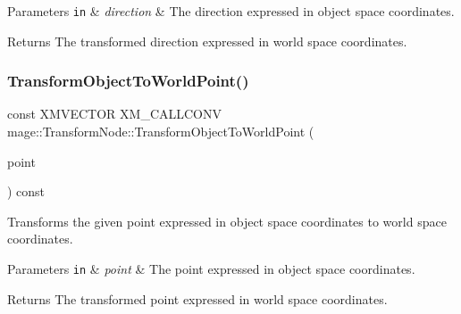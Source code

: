 \begin{DoxyParams}[1]{Parameters}
\mbox{\tt in}  & {\em direction} & The direction expressed in object space coordinates. \\
\hline
\end{DoxyParams}
\begin{DoxyReturn}{Returns}
The transformed direction expressed in world space coordinates. 
\end{DoxyReturn}
\hypertarget{structmage_1_1_transform_node_a0cd8cd0683c141f2632d96bb3c155614}{}\label{structmage_1_1_transform_node_a0cd8cd0683c141f2632d96bb3c155614} 
\subsubsection{\texorpdfstring{Transform\+Object\+To\+World\+Point()}{TransformObjectToWorldPoint()}}
{\footnotesize\ttfamily const X\+M\+V\+E\+C\+T\+OR X\+M\+\_\+\+C\+A\+L\+L\+C\+O\+NV mage\+::\+Transform\+Node\+::\+Transform\+Object\+To\+World\+Point (\begin{DoxyParamCaption}\item[{F\+X\+M\+V\+E\+C\+T\+OR}]{point }\end{DoxyParamCaption}) const\hspace{0.3cm}{\ttfamily [noexcept]}}

Transforms the given point expressed in object space coordinates to world space coordinates.


\begin{DoxyParams}[1]{Parameters}
\mbox{\tt in}  & {\em point} & The point expressed in object space coordinates. \\
\hline
\end{DoxyParams}
\begin{DoxyReturn}{Returns}
The transformed point expressed in world space coordinates. 
\end{DoxyReturn}
\hypertarget{structmage_1_1_transform_node_aa649804646f82257522c5136f0d4d2a0}{}\label{structmage_1_1_transform_node_aa649804646f82257522c5136f0d4d2a0} 
